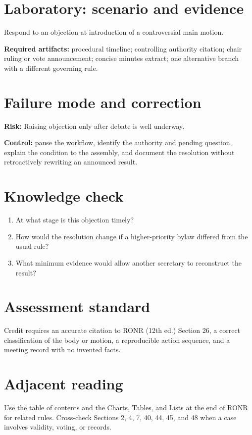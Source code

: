 \documentclass[11pt]{article}
\begin{document}
\section{Laboratory: scenario and evidence}
Respond to an objection at introduction of a controversial main motion.

\textbf{Required artifacts:} procedural timeline; controlling authority citation; chair ruling or vote announcement; concise minutes extract; one alternative branch with a different governing rule.

\section{Failure mode and correction}
\textbf{Risk:} Raising objection only after debate is well underway.

\textbf{Control:} pause the workflow, identify the authority and pending question, explain the condition to the assembly, and document the resolution without retroactively rewriting an announced result.

\section{Knowledge check}
\begin{enumerate}[leftmargin=*,itemsep=4pt]
\item At what stage is this objection timely?
\item How would the resolution change if a higher-priority bylaw differed from the usual rule?
\item What minimum evidence would allow another secretary to reconstruct the result?
\end{enumerate}

\section{Assessment standard}
Credit requires an accurate citation to RONR (12th ed.) Section 26, a correct classification of the body or motion, a reproducible action sequence, and a meeting record with no invented facts.

\section{Adjacent reading}
Use the table of contents and the Charts, Tables, and Lists at the end of RONR for related rules. Cross-check Sections 2, 4, 7, 40, 44, 45, and 48 when a case involves validity, voting, or records.
\end{document}
